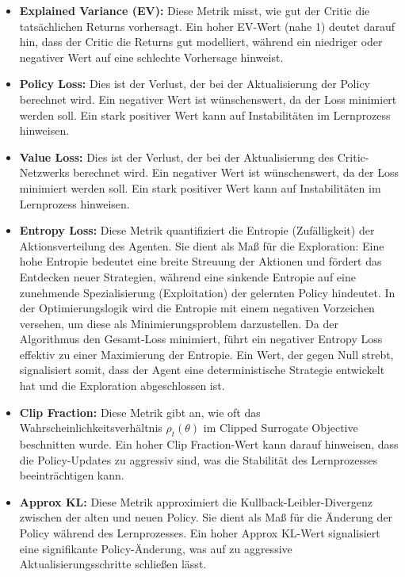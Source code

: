\begin{itemize}
    \item \textbf{Explained Variance (EV):} Diese Metrik misst, wie gut der Critic die tatsächlichen Returns vorhersagt. Ein hoher EV\hyp{}Wert (nahe 1) deutet darauf hin, dass der Critic
    die Returns gut modelliert, während ein niedriger oder negativer Wert auf eine schlechte Vorhersage hinweist.
    \item \textbf{Policy Loss:} Dies ist der Verlust, der bei der Aktualisierung der Policy berechnet wird. Ein negativer Wert ist wünschenswert, da der Loss minimiert werden soll. 
    Ein stark positiver Wert kann auf Instabilitäten im Lernprozess hinweisen.
    \item \textbf{Value Loss:} Dies ist der Verlust, der bei der Aktualisierung des Critic\hyp{}Netzwerks berechnet wird. Ein negativer Wert ist wünschenswert, da der Loss minimiert werden soll. 
    Ein stark positiver Wert kann auf Instabilitäten im Lernprozess hinweisen.
    \item \textbf{Entropy Loss:} Diese Metrik quantifiziert die Entropie (Zufälligkeit) der Aktionsverteilung des Agenten. Sie dient als Maß für die Exploration: 
    Eine hohe Entropie bedeutet eine breite Streuung der Aktionen und fördert das Entdecken neuer Strategien, während eine sinkende Entropie auf eine zunehmende 
    Spezialisierung (Exploitation) der gelernten Policy hindeutet. In der Optimierungslogik wird die Entropie mit einem negativen Vorzeichen versehen, um diese 
    als Minimierungsproblem darzustellen. Da der Algorithmus den Gesamt\hyp{}Loss minimiert, führt ein negativer Entropy Loss effektiv zu einer Maximierung der Entropie. 
    Ein Wert, der gegen Null strebt, signalisiert somit, dass der Agent eine deterministische Strategie entwickelt hat und die Exploration abgeschlossen ist.
    \item \textbf{Clip Fraction:} Diese Metrik gibt an, wie oft das Wahrscheinlichkeitsverhältnis \(\rho_t(\theta)\) im Clipped Surrogate Objective beschnitten wurde.
    Ein hoher Clip Fraction\hyp{}Wert kann darauf hinweisen, dass die Policy\hyp{}Updates zu aggressiv sind, was die Stabilität des Lernprozesses beeinträchtigen kann.
    \item \textbf{Approx KL:} Diese Metrik approximiert die Kullback\hyp{}Leibler\hyp{}Divergenz zwischen der alten und neuen Policy. Sie dient als Maß für die Änderung 
    der Policy während des Lernprozesses. Ein hoher Approx KL\hyp{}Wert signalisiert eine signifikante Policy\hyp{}Änderung, was auf zu aggressive Aktualisierungsschritte schließen lässt.
\end{itemize}
\pagebreak

